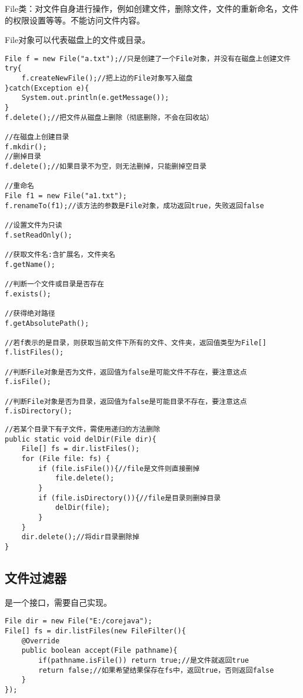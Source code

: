 \documentclass[a4paper]{report}
\begin{document}
File类：对文件自身进行操作，例如创建文件，删除文件，文件的重新命名，文件的权限设置等等。不能访问文件内容。

File对象可以代表磁盘上的文件或目录。

\begin{lstlisting}
File f = new File("a.txt");//只是创建了一个File对象，并没有在磁盘上创建文件
try{
    f.createNewFile();//把上边的File对象写入磁盘
}catch(Exception e){
    System.out.println(e.getMessage());
}
f.delete();//把文件从磁盘上删除（彻底删除，不会在回收站）

//在磁盘上创建目录
f.mkdir();
//删掉目录
f.delete();//如果目录不为空，则无法删掉，只能删掉空目录

//重命名
File f1 = new File("a1.txt");
f.renameTo(f1);//该方法的参数是File对象，成功返回true，失败返回false

//设置文件为只读
f.setReadOnly();

//获取文件名:含扩展名，文件夹名
f.getName();

//判断一个文件或目录是否存在
f.exists();

//获得绝对路径
f.getAbsolutePath();

//若f表示的是目录，则获取当前文件下所有的文件、文件夹，返回值类型为File[]
f.listFiles();

//判断File对象是否为文件，返回值为false是可能文件不存在，要注意这点
f.isFile();

//判断File对象是否为目录，返回值为false是可能目录不存在，要注意这点
f.isDirectory();
\end{lstlisting}

\begin{lstlisting}[title=删除目录]
//若某个目录下有子文件，需使用递归的方法删除
public static void delDir(File dir){
    File[] fs = dir.listFiles();
    for (File file: fs) {
        if (file.isFile()){//file是文件则直接删掉
            file.delete();
        }
        if (file.isDirectory()){//file是目录则删掉目录
            delDir(file);
        }
    }
    dir.delete();//将dir目录删除掉
}
\end{lstlisting}

\subsection{文件过滤器}

是一个接口，需要自己实现。
\begin{lstlisting}
File dir = new File("E:/corejava");
File[] fs = dir.listFiles(new FileFilter(){
    @Override
    public boolean accept(File pathname){
        if(pathname.isFile()) return true;//是文件就返回true
        return false;//如果希望结果保存在fs中，返回true，否则返回false
    }
});
\end{lstlisting}
\end{document}
